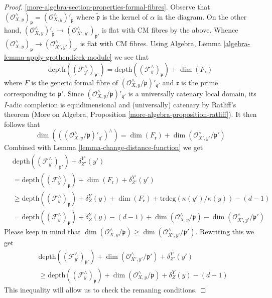 \begin{proof}
\ref{more-algebra-section-properties-formal-fibres}.
Observe that $(\mathcal{O}_{X, y}^\wedge)_\mathfrak p =
(\mathcal{O}_{X, y}^\wedge)'_{\tilde{\mathfrak p}}$
where $\tilde{\mathfrak p}$ is the kernel of $\alpha$
in the diagram. On the other hand,
$(\mathcal{O}_{X, y}^\wedge)'_{\tilde{\mathfrak p}}
\to (\mathcal{O}_{X', y'}^\wedge)_{\mathfrak p'}$
is flat with CM fibres by the above. Whence
$(\mathcal{O}_{X, y}^\wedge)_\mathfrak p  \to
(\mathcal{O}_{X', y'}^\wedge)_{\mathfrak p'}$ is flat with CM fibres.
Using Algebra, Lemma \ref{algebra-lemma-apply-grothendieck-module}
we see that
$$
\text{depth}((\mathcal{F}_{y'}^\wedge)_{\mathfrak p'}) =
\text{depth}((\mathcal{F}_y^\wedge)_{\mathfrak p}) +
\dim(F_\mathfrak r)
$$
where $F$ is the generic formal fibre of
$(\mathcal{O}_{X, y}^\wedge/\mathfrak p)'_{\mathfrak q'}$
and $\mathfrak r$ is the prime corresponding to $\mathfrak p'$.
Since $(\mathcal{O}_{X, y}^\wedge/\mathfrak p)'_{\mathfrak q'}$
is a universally catenary local domain, its $I$-adic completion
is equidimensional and (universally) catenary by Ratliff's theorem
(More on Algebra, Proposition \ref{more-algebra-proposition-ratliff}).
It then follows that
$$
\dim(((\mathcal{O}_{X, y}^\wedge/\mathfrak p)'_{\mathfrak q'})^\wedge) =
\dim(F_\mathfrak r) + \dim(\mathcal{O}_{X', y'}^\wedge/\mathfrak p')
$$
Combined with Lemma \ref{lemma-change-distance-function}
we get
\begin{equation}
\label{equation-one}
\begin{aligned}
&
\text{depth}((\mathcal{F}_{y'}^\wedge)_{\mathfrak p'}) +
\delta^{Y'}_{Z'}(y') \\
& =
\text{depth}((\mathcal{F}_y^\wedge)_{\mathfrak p}) +
\dim(F_\mathfrak r) + \delta^{Y'}_{Z'}(y') \\
& \geq
\text{depth}((\mathcal{F}_y^\wedge)_{\mathfrak p}) + \delta^Y_Z(y) +
\dim(F_\mathfrak r) + \text{trdeg}(\kappa(y')/\kappa(y)) - (d - 1) \\
& =
\text{depth}((\mathcal{F}_y^\wedge)_{\mathfrak p}) + \delta^Y_Z(y) - (d - 1)
+ \dim(\mathcal{O}_{X, y}^\wedge/\mathfrak p) -
\dim(\mathcal{O}_{X', y'}^\wedge/\mathfrak p')
\end{aligned}
\end{equation}
Please keep in mind that
$\dim(\mathcal{O}_{X, y}^\wedge/\mathfrak p) \geq
\dim(\mathcal{O}_{X', y'}^\wedge/\mathfrak p')$. Rewriting this we get
\begin{equation}
\label{equation-two}
\begin{aligned}
&
\text{depth}((\mathcal{F}_{y'}^\wedge)_{\mathfrak p'}) +
\dim(\mathcal{O}_{X', y'}^\wedge/\mathfrak p') +
\delta^{Y'}_{Z'}(y') \\
& \geq
\text{depth}((\mathcal{F}_y^\wedge)_{\mathfrak p}) +
\dim(\mathcal{O}_{X, y}^\wedge/\mathfrak p) +
\delta^Y_Z(y) - (d - 1)
\end{aligned}
\end{equation}
This inequality will allow us to check the remaning conditions.


\end{proof}
